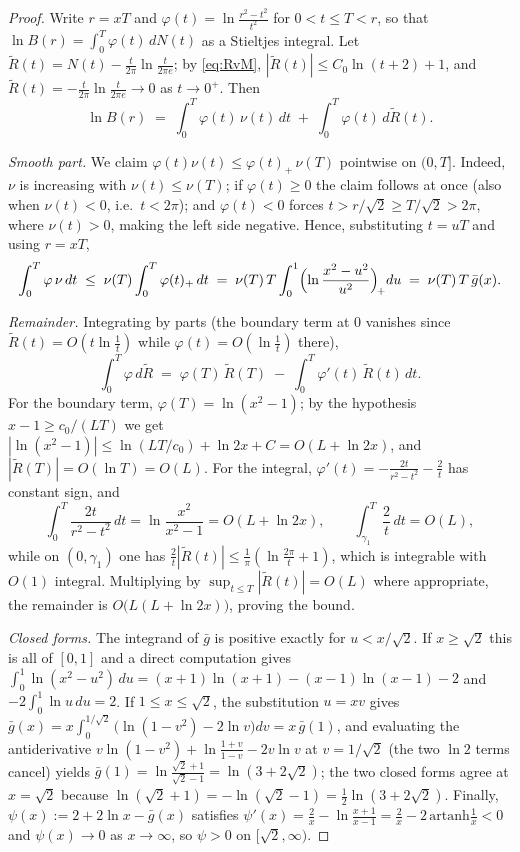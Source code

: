 ﻿\documentclass[11pt]{article}
\begin{document}
\begin{proof}
Write $r=xT$ and $\varphi(t)=\ln\frac{r^{2}-t^{2}}{t^{2}}$ for
$0<t\le T<r$, so that $\ln B(r)=\int_{0}^{T}\varphi(t)\,dN(t)$ as a
Stieltjes integral.  Let
$\widetilde R(t)=N(t)-\frac{t}{2\pi}\ln\frac{t}{2\pi e}$; by
\eqref{eq:RvM}, $|\widetilde R(t)|\le C_0\ln(t+2)+1$, and
$\widetilde R(t)=-\frac{t}{2\pi}\ln\frac{t}{2\pi e}\to0$ as $t\to0^+$.
Then
\begin{equation}\label{eq:split}
  \ln B(r)\;=\;\int_{0}^{T}\varphi(t)\,\nu(t)\,dt
  \;+\;\int_{0}^{T}\varphi(t)\,d\widetilde R(t).
\end{equation}

\emph{Smooth part.}  We claim
$\varphi(t)\nu(t)\le\varphi(t)_{+}\,\nu(T)$ pointwise on $(0,T]$.
Indeed, $\nu$ is increasing with $\nu(t)\le\nu(T)$; if
$\varphi(t)\ge0$ the claim follows at once (also when $\nu(t)<0$,
i.e.\ $t<2\pi$); and $\varphi(t)<0$ forces $t>r/\sqrt2\ge T/\sqrt2
>2\pi$, where $\nu(t)>0$, making the left side negative.  Hence,
substituting $t=uT$ and using $r=xT$,
\[
  \int_{0}^{T}\varphi\,\nu\,dt
  \;\le\;\nu(T)\int_{0}^{T}\varphi(t)_{+}\,dt
  \;=\;\nu(T)\,T\int_{0}^{1}
  \Bigl(\ln\frac{x^{2}-u^{2}}{u^{2}}\Bigr)_{\!+}du
  \;=\;\nu(T)\,T\,\bar g(x).
\]

\emph{Remainder.}  Integrating by parts (the boundary term at $0$
vanishes since $\widetilde R(t)=O(t\ln\frac1t)$ while
$\varphi(t)=O(\ln\frac1t)$ there),
\[
  \int_{0}^{T}\varphi\,d\widetilde R
  \;=\;\varphi(T)\,\widetilde R(T)
  \;-\;\int_{0}^{T}\varphi'(t)\,\widetilde R(t)\,dt .
\]
For the boundary term, $\varphi(T)=\ln(x^{2}-1)$; by the hypothesis
$x-1\ge c_0/(LT)$ we get
$|\ln(x^2-1)|\le\ln(LT/c_0)+\ln2x+C=O(L+\ln 2x)$, and
$|\widetilde R(T)|=O(\ln T)=O(L)$.  For the integral,
$\varphi'(t)=-\frac{2t}{r^{2}-t^{2}}-\frac{2}{t}$ has constant sign,
and
\[
  \int_{0}^{T}\frac{2t}{r^{2}-t^{2}}\,dt
  =\ln\frac{x^{2}}{x^{2}-1}
  = O(L+\ln 2x),
  \qquad
  \int_{\gamma_1}^{T}\frac{2}{t}\,dt=O(L),
\]
while on $(0,\gamma_1)$ one has
$\frac2t|\widetilde R(t)|\le\frac1\pi(\ln\frac{2\pi}{t}+1)$, which is
integrable with $O(1)$ integral.  Multiplying by
$\sup_{t\le T}|\widetilde R(t)|=O(L)$ where appropriate, the remainder
is $O\bigl(L(L+\ln 2x)\bigr)$, proving the bound.

\emph{Closed forms.}  The integrand of $\bar g$ is positive exactly
for $u<x/\sqrt2$.  If $x\ge\sqrt2$ this is all of $[0,1]$ and a direct
computation gives
$\int_0^1\ln(x^2-u^2)\,du=(x{+}1)\ln(x{+}1)-(x{-}1)\ln(x{-}1)-2$ and
$-2\int_0^1\ln u\,du=2$.  If $1\le x\le\sqrt2$, the substitution
$u=xv$ gives
$\bar g(x)=x\int_{0}^{1/\sqrt2}\bigl(\ln(1-v^{2})-2\ln v\bigr)dv
=x\,\bar g(1)$, and evaluating the antiderivative
$v\ln(1-v^{2})+\ln\frac{1+v}{1-v}-2v\ln v$ at $v=1/\sqrt2$ (the two
$\ln2$ terms cancel) yields
$\bar g(1)=\ln\frac{\sqrt2+1}{\sqrt2-1}=\ln(3+2\sqrt2)$; the two
closed forms agree at $x=\sqrt2$ because
$\ln(\sqrt2+1)=-\ln(\sqrt2-1)=\tfrac12\ln(3+2\sqrt2)$.  Finally,
$\psi(x):=2+2\ln x-\bar g(x)$ satisfies
$\psi'(x)=\frac2x-\ln\frac{x+1}{x-1}=\frac2x-2\,\mathrm{artanh}\frac1x
<0$ and $\psi(x)\to0$ as $x\to\infty$, so $\psi>0$ on
$[\sqrt2,\infty)$.
\end{proof}
\end{document}
